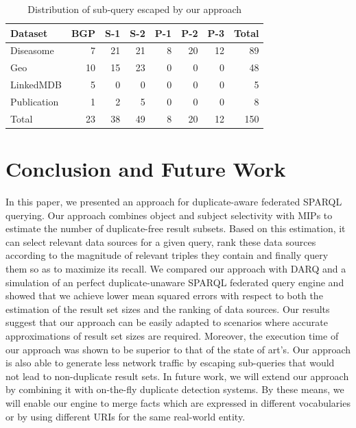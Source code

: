 \documentclass{sig-alternate}  %
\begin{document}
\begin{table}
\centering
\begin{tabular}{lrrrrrrr}
\hline
Dataset		&BGP 	&S-1&S-2&P-1&P-2&P-3&Total \\\hline
Diseasome				&7		&21	&21	&8	&20	&12	&89\\
Geo 	&10		&15	&23	&0	&0	&0	&48\\
LinkedMDB				&5		&0	&0	&0	&0	&0	&5\\
Publication			&1		&2	&5	&0	&0	&0	&8\\\hline
Total 					&23		&38	&49	&8	&20	&12	&150 \\\hline
\end{tabular}
\caption{Distribution of sub-query escaped by our approach}
\label{tab:escaped}
\end{table}


\section{Conclusion and Future Work}
In this paper, we presented an approach for duplicate-aware federated SPARQL querying.
Our approach combines object and subject selectivity with MIPs to estimate the number of duplicate-free result subsets.
Based on this estimation, it can select relevant data sources for a given query, rank these data sources according to the magnitude of relevant triples they contain and finally query them so as to maximize its recall.
We compared our approach with DARQ and a simulation of an perfect duplicate-unaware SPARQL federated query engine and showed that we achieve lower mean squared errors with respect to both the estimation of the result set sizes and the ranking of data sources.
Our results suggest that our approach can be easily adapted to scenarios where accurate approximations of result set sizes are required.
Moreover, the execution time of our approach was shown to be superior to that of the state of art's.
Our approach is also able to generate less network traffic by escaping sub-queries that would not lead to non-duplicate result sets.
In future work, we will extend our approach by combining it with on-the-fly duplicate detection systems. 
By these means, we will enable our engine to merge facts which are expressed in different vocabularies or by using different URIs for the same real-world entity.
\end{document}
